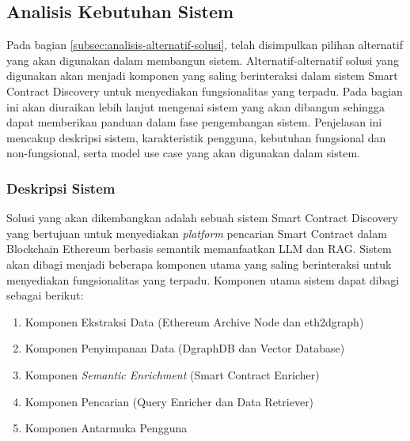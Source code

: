 \subsection{Analisis Kebutuhan Sistem}

Pada bagian \ref{subsec:analisis-alternatif-solusi}, telah disimpulkan pilihan alternatif yang akan digunakan dalam membangun sistem. Alternatif-alternatif solusi yang digunakan akan menjadi komponen yang saling berinteraksi dalam sistem Smart Contract Discovery untuk menyediakan fungsionalitas yang terpadu. Pada bagian ini akan diuraikan lebih lanjut mengenai sistem yang akan dibangun sehingga dapat memberikan panduan dalam fase pengembangan sistem. Penjelasan ini mencakup deskripsi sistem, karakteristik pengguna, kebutuhan fungsional dan non-fungsional, serta model use case yang akan digunakan dalam sistem.

\subsubsection{Deskripsi Sistem}

Solusi yang akan dikembangkan adalah sebuah sistem Smart Contract Discovery yang bertujuan untuk menyediakan \textit{platform} pencarian Smart Contract dalam Blockchain Ethereum berbasis semantik memanfaatkan LLM dan RAG. Sistem akan dibagi menjadi beberapa komponen utama yang saling berinteraksi untuk menyediakan fungsionalitas yang terpadu. Komponen utama sistem dapat dibagi sebagai berikut:

\begin{enumerate}
	\item Komponen Ekstraksi Data (Ethereum Archive Node dan eth2dgraph)
	\item Komponen Penyimpanan Data (DgraphDB dan Vector Database)
	\item Komponen \textit{Semantic Enrichment} (Smart Contract Enricher)
	\item Komponen Pencarian (Query Enricher dan Data Retriever)
	\item Komponen Antarmuka Pengguna
\end{enumerate}

